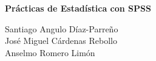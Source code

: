 \documentclass[11pt,openright]{book}%
\begin{document}
\begin{titlepage}
\centering
\vspace*{9cm}
\par\normalfont\fontsize{35}{35}\sffamily\selectfont
\textcolor{ocre}{\textbf{Prácticas de Estadística con SPSS}}\par %
\vspace{1cm}
{\LARGE \color{grayceu}
Santiago Angulo Díaz-Parreño \\
José Miguel Cárdenas Rebollo \\
Anselmo Romero Limón \\
}
\end{titlepage}
\end{document}
